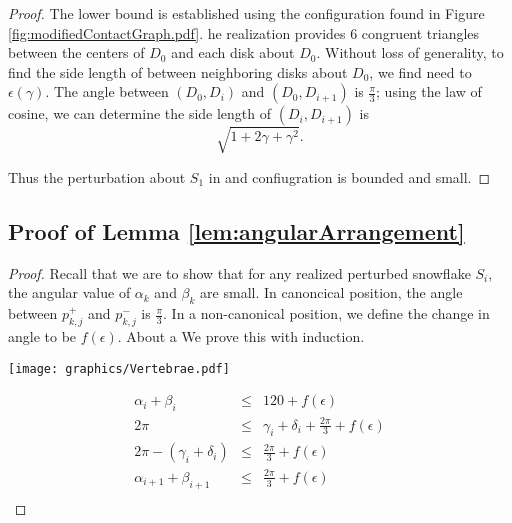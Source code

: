 \documentclass[10pt]{CSUNthesis}
\theoremstyle{plain}%
\theoremstyle{definition}
\theoremstyle{remark}
\newcommand{\lr}[1]{\left( #1 \right)}
\begin{document}
\begin{proof}
The lower bound is established using the configuration found in Figure \ref{fig:modifiedContactGraph.pdf}.  
he realization provides 6 congruent triangles between the centers of $D_0$ and each disk about $D_0$.
Without loss of generality, to find the side length of between neighboring disks about $D_0$, we find need to $\epsilon(\gamma)$.  
The angle between $\lr{D_0, D_i}$ and $\lr{D_0,D_{i+1}}$ is $\frac{\pi}{3}$; using the law of cosine, we can determine the side length of $\lr{D_i,D_{i+1}}$ is $$\sqrt{1 + 2 \gamma + \gamma^2}.$$  


Thus the perturbation about $S_1$ in and confiugration is bounded and small.
\end{proof}
\subsection{Proof of Lemma \ref{lem:angularArrangement}}
\begin{proof}
Recall that we are to show that for any realized perturbed snowflake $S_i$, the angular value of $\alpha_k$ and $\beta_k$ are small.  
In canoncical position, the angle between $p_{k,j}^+$ and $p_{k,j}^-$ is $\frac{\pi}{3}$.  
In a non-canonical position, we define the change in angle to be $f(\epsilon)$.  
About a 
We prove this with induction. 


\begin{minipage}{\linewidth}
\begin{center}
\texttt{[image: graphics/Vertebrae.pdf]}
\label{fig:Vertebrae.pdf}
\end{center}
\end{minipage}

$$
\begin{array}{rcl}
\alpha_i +\beta_i &\leq& 120 + f(\epsilon)\\
2 \pi &\leq& \gamma_i + \delta_i + \frac{2 \pi}{3} + f(\epsilon)\\
2 \pi - \lr{\gamma_i + \delta_i} &\leq& \frac{2 \pi}{3} + f(\epsilon)\\
\alpha_{i+1} + \beta_{i+1} &\leq& \frac{2 \pi}{3} + f(\epsilon)\\
\end{array}
$$
\end{proof}
\end{document}
